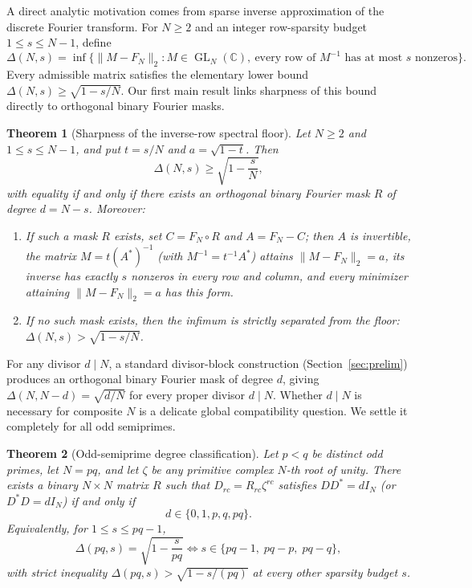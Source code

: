\documentclass[11pt,reqno]{amsart}
\numberwithin{equation}{section}
\newtheorem{theorem}{Theorem}[section]
\theoremstyle{definition}
\theoremstyle{remark}
\newcommand{\C}{\mathbb{C}}
\newcommand{\GL}{\operatorname{GL}}
\begin{document}
A direct analytic motivation comes from sparse inverse approximation of the discrete Fourier transform. For $N\ge 2$ and an integer row-sparsity budget $1\le s\le N-1$, define
\begin{equation}
\label{eq:delta-def}
\Delta(N,s) = \inf\bigl\{\|M - F_N\|_2 : M\in\GL_N(\C),\ \text{every row of } M^{-1}\text{ has at most }s\text{ nonzeros}\bigr\}.
\end{equation}
Every admissible matrix satisfies the elementary lower bound $\Delta(N,s)\ge \sqrt{1-s/N}$. Our first main result links sharpness of this bound directly to orthogonal binary Fourier masks.

\begin{theorem}[Sharpness of the inverse-row spectral floor]
\label{thm:inverse-row}
Let $N\ge 2$ and $1\le s\le N-1$, and put $t=s/N$ and $a=\sqrt{1-t}$. Then
\[
\Delta(N,s) \ge \sqrt{1-\frac{s}{N}},
\]
with equality if and only if there exists an orthogonal binary Fourier mask $R$ of degree $d=N-s$. Moreover:
\begin{enumerate}[label=(\alph*),leftmargin=2em]
\item If such a mask $R$ exists, set $C=F_N\circ R$ and $A=F_N-C$; then $A$ is invertible, the matrix $M = t(A^*)^{-1}$ (with $M^{-1}=t^{-1}A^*$) attains $\|M-F_N\|_2=a$, its inverse has exactly $s$ nonzeros in every row and column, and every minimizer attaining $\|M-F_N\|_2=a$ has this form.
\item If no such mask exists, then the infimum is strictly separated from the floor: $\Delta(N,s)>\sqrt{1-s/N}$.
\end{enumerate}
\end{theorem}

For any divisor $d\mid N$, a standard divisor-block construction (Section~\ref{sec:prelim}) produces an orthogonal binary Fourier mask of degree $d$, giving $\Delta(N,N-d)=\sqrt{d/N}$ for every proper divisor $d\mid N$. Whether $d\mid N$ is necessary for composite $N$ is a delicate global compatibility question. We settle it completely for all odd semiprimes.

\begin{theorem}[Odd-semiprime degree classification]
\label{thm:odd-semiprime}
Let $p<q$ be distinct odd primes, let $N=pq$, and let $\zeta$ be any primitive complex $N$-th root of unity. There exists a binary $N\times N$ matrix $R$ such that $D_{rc}=R_{rc}\zeta^{rc}$ satisfies $DD^*=dI_N$ (or $D^*D=dI_N$) if and only if
\begin{equation}
\label{eq:semiprime-deg}
d \in \{0, 1, p, q, pq\}.
\end{equation}
Equivalently, for $1\le s\le pq-1$,
\[
\Delta(pq,s) = \sqrt{1-\frac{s}{pq}} \iff s \in \{pq-1,\; pq-p,\; pq-q\},
\]
with strict inequality $\Delta(pq,s)>\sqrt{1-s/(pq)}$ at every other sparsity budget $s$.
\end{theorem}
\end{document}

